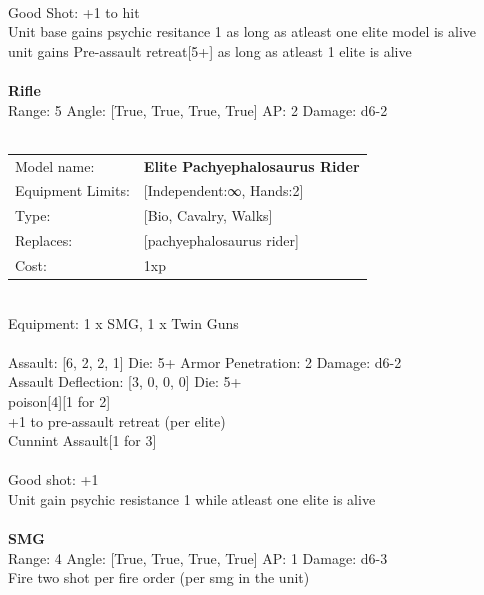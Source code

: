 \ \\
Good Shot: +1 to hit\\ 
Unit base gains psychic resitance 1 as long as atleast one elite model is alive\\ 
unit gains Pre-assault retreat[5+] as long as atleast 1 elite is alive\\ 

\ \\
{\bf Rifle } \\



Range: 5  Angle: [True, True, True, True] AP: 2 Damage: d6-2 \\




 
\ \\

\noindent
\begin{tabular}{ll}
Model name: &{\bf Elite Pachyephalosaurus Rider } \\
Equipment Limits: &[Independent:∞, Hands:2] \\
Type: &[Bio, Cavalry, Walks] \\
Replaces: &[pachyephalosaurus rider] \\
Cost: & 1xp\\
\end{tabular}
\ \\
Equipment: 1 x SMG, 1 x Twin Guns \\
\ \\
Assault: [6, 2, 2, 1] Die: 5+ Armor Penetration: 2 Damage: d6-2 \\
Assault Deflection: [3, 0, 0, 0] Die: 5+\\
\indent poison[4][1 for 2]\\ 
+1 to pre-assault retreat (per elite)\\ 
Cunnint Assault[1 for 3]\\ 
 
\ \\
Good shot: +1\\ 
Unit gain psychic resistance 1 while atleast one elite is alive\\ 

\ \\
{\bf SMG } \\



Range: 4  Angle: [True, True, True, True] AP: 1 Damage: d6-3 \\
Fire two shot per fire order (per smg in the unit)\\ 




